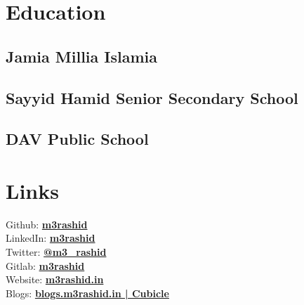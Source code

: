 \documentclass[]{deedy-resume-openfont}
\begin{document}
%
%

%
%
%
%

\begin{minipage}[t]{0.33\textwidth} 


\section{Education} 

\subsection{Jamia Millia Islamia}
\sectionsep

\subsection{Sayyid Hamid Senior Secondary School}
\sectionsep

\subsection{DAV Public School}
\sectionsep


\section{Links} 
Github:  \href{https://github.com/m3rashid}{\bf m3rashid} \\
LinkedIn:  \href{https://www.linkedin.com/in/m3rashid}{\bf m3rashid} \\
Twitter:  \href{https://twitter.com/m3_rashid}{\bf @m3\_rashid} \\
Gitlab:  \href{https://www.gitlab.com/m3rashid}{\bf m3rashid} \\
Website:  \href{https://m3rashid.in}{\bf m3rashid.in} \\
Blogs:   \href{https://blogs.m3rashid.in}{\bf blogs.m3rashid.in | Cubicle} \\
\sectionsep


\end{minipage}
\end{document}
